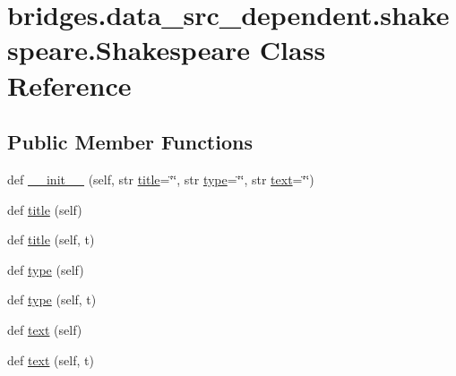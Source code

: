 \hypertarget{classbridges_1_1data__src__dependent_1_1shakespeare_1_1_shakespeare}{}\section{bridges.\+data\+\_\+src\+\_\+dependent.\+shakespeare.\+Shakespeare Class Reference}
\label{classbridges_1_1data__src__dependent_1_1shakespeare_1_1_shakespeare}
\subsection*{Public Member Functions}
\begin{DoxyCompactItemize}
\item 
def \mbox{\hyperlink{classbridges_1_1data__src__dependent_1_1shakespeare_1_1_shakespeare_aee1c057a682d949b9064a8248725944d}{\+\_\+\+\_\+init\+\_\+\+\_\+}} (self, str \mbox{\hyperlink{classbridges_1_1data__src__dependent_1_1shakespeare_1_1_shakespeare_a3bd228852c9e0fc4653ada17f1803c15}{title}}=\char`\"{}\char`\"{}, str \mbox{\hyperlink{classbridges_1_1data__src__dependent_1_1shakespeare_1_1_shakespeare_ae2499dd686160849220edc662246e42a}{type}}=\char`\"{}\char`\"{}, str \mbox{\hyperlink{classbridges_1_1data__src__dependent_1_1shakespeare_1_1_shakespeare_a588e767fe0f474440f2b9a1fda8ede96}{text}}=\char`\"{}\char`\"{})
\item 
def \mbox{\hyperlink{classbridges_1_1data__src__dependent_1_1shakespeare_1_1_shakespeare_a3bd228852c9e0fc4653ada17f1803c15}{title}} (self)
\item 
def \mbox{\hyperlink{classbridges_1_1data__src__dependent_1_1shakespeare_1_1_shakespeare_abbf3b79e27e5e4afc1040a340dbf4d49}{title}} (self, t)
\item 
def \mbox{\hyperlink{classbridges_1_1data__src__dependent_1_1shakespeare_1_1_shakespeare_ae2499dd686160849220edc662246e42a}{type}} (self)
\item 
def \mbox{\hyperlink{classbridges_1_1data__src__dependent_1_1shakespeare_1_1_shakespeare_a9b4489402fda80ec8360bb17ad3d0af9}{type}} (self, t)
\item 
def \mbox{\hyperlink{classbridges_1_1data__src__dependent_1_1shakespeare_1_1_shakespeare_a588e767fe0f474440f2b9a1fda8ede96}{text}} (self)
\item 
def \mbox{\hyperlink{classbridges_1_1data__src__dependent_1_1shakespeare_1_1_shakespeare_af81f61dc7578547f5ed42792fc36e37a}{text}} (self, t)
\end{DoxyCompactItemize}


